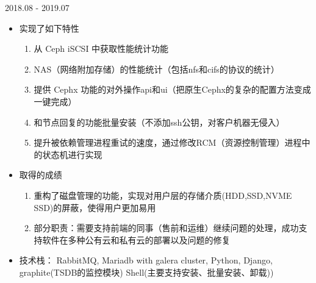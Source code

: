 \documentclass{resume}
\begin{document}
 {2018.08 - 2019.07}
\newline
{}
\begin{onehalfspacing}
\begin{itemize}
  \item 实现了如下特性
  \begin{enumerate}
    \item  从 Ceph iSCSI 中获取性能统计功能
    \item  NAS（网络附加存储）的性能统计（包括nfs和cifs的协议的统计）
    \item 提供 Cephx 功能的对外操作api和ui（把原生Cephx的复杂的配置方法变成一键完成）
    \item 和节点回复的功能批量安装（不添加ssh公钥，对客户机器无侵入）
    \item 提升被依赖管理进程重试的速度，通过修改RCM（资源控制管理）进程中的状态机进行实现
  \end{enumerate}
  \item 取得的成绩
  \begin{enumerate}
    \item 重构了磁盘管理的功能，实现对用户层的存储介质(HDD,SSD,NVME SSD)的屏蔽，使得用户更加易用
    \item 部分职责：需要支持前端的同事（售前和运维）继续问题的处理，成功支持软件在多种公有云和私有云的部署以及问题的修复
  \end{enumerate}
\end{itemize}
\begin{itemize}
  \item 技术栈： RabbitMQ, Mariadb with galera cluster, Python, Django, graphite(TSDB的监控模块)
                Shell(主要支持安装、批量安装、卸载))
\end{itemize}
\end{onehalfspacing}
\end{document}
